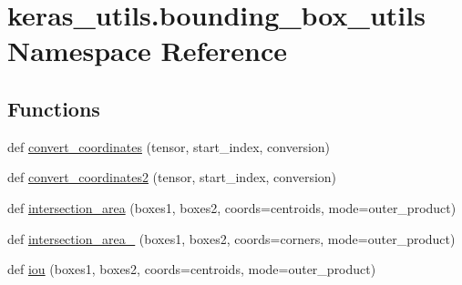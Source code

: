 \hypertarget{namespacekeras__utils_1_1bounding__box__utils}{}\section{keras\+\_\+utils.\+bounding\+\_\+box\+\_\+utils Namespace Reference}
\label{namespacekeras__utils_1_1bounding__box__utils}
\subsection*{Functions}
\begin{DoxyCompactItemize}
\item 
def \hyperlink{namespacekeras__utils_1_1bounding__box__utils_a7b2a9d86d4acfcddcec55133486f2012}{convert\+\_\+coordinates} (tensor, start\+\_\+index, conversion)
\item 
def \hyperlink{namespacekeras__utils_1_1bounding__box__utils_a924087a3e5b888d700dbff75254f370b}{convert\+\_\+coordinates2} (tensor, start\+\_\+index, conversion)
\item 
def \hyperlink{namespacekeras__utils_1_1bounding__box__utils_a91ddfb47dfc8b356861c2a04950b7913}{intersection\+\_\+area} (boxes1, boxes2, coords=\textquotesingle{}centroids\textquotesingle{}, mode=\textquotesingle{}outer\+\_\+product\textquotesingle{})
\item 
def \hyperlink{namespacekeras__utils_1_1bounding__box__utils_a61242ff96fe1b973d428544abdbfed53}{intersection\+\_\+area\+\_\+} (boxes1, boxes2, coords=\textquotesingle{}corners\textquotesingle{}, mode=\textquotesingle{}outer\+\_\+product\textquotesingle{})
\item 
def \hyperlink{namespacekeras__utils_1_1bounding__box__utils_a2aa9711828ff2fd23f2769c95bfa3b52}{iou} (boxes1, boxes2, coords=\textquotesingle{}centroids\textquotesingle{}, mode=\textquotesingle{}outer\+\_\+product\textquotesingle{})
\end{DoxyCompactItemize}


